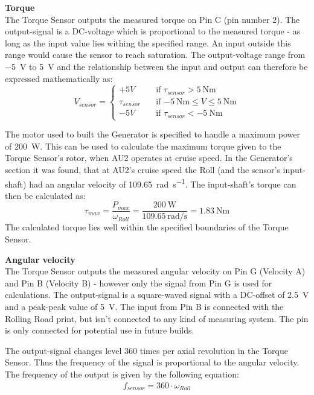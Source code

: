\textbf{Torque}\\
The Torque Sensor outputs the measured torque on Pin C (pin number 2). The output-signal is a DC-voltage which is proportional to the measured torque - as long as the input value lies withing the specified range. An input outside this range would cause the sensor to reach saturation. The output-voltage range from \SI{-5}{\volt} to \SI{+5}{\volt} and the relationship between the input and output can therefore be expressed mathematically as:
\begin{equation}
	V_{sensor} = 
	\begin{cases}
		+5V				& \quad \text{if } \tau_{sensor} > \SI{+5}{\newton \meter}\\
		\tau_{sensor}   & \quad \text{if } \SI{-5}{\newton \meter} \leq V \leq \SI{+5}{\newton \meter}\\
		-5V				& \quad \text{if } \tau_{sensor} < \SI{-5}{\newton \meter}
	\end{cases}
\end{equation}

The motor used to built the Generator is specified to handle a maximum power of \SI{200}{\watt}\cite{Maxon}. This can be used to calculate the maximum torque given to the Torque Sensor's rotor, when AU2 operates at cruise speed. In the Generator's section it was found, that at AU2's cruise speed the Roll (and the sensor's input-shaft) had an angular velocity of \SI[per-mode=fraction]{109.65}{\radian \per \second}. The input-shaft's torque can then be calculated as:
\begin{equation}
	\tau_{max} = \frac{P_{max}}{\omega_{Roll}} = \frac{\SI{200}{\watt}}{\SI[per-mode=fraction]{109.65}{\radian \per \second}} = \SI{1.83}{\newton \meter}
\end{equation}
The calculated torque lies well within the specified boundaries of the Torque Sensor\cite{TorqueSensor}.

\textbf{Angular velocity}\\
The Torque Sensor outputs the measured angular velocity on Pin G (Velocity A) and Pin B (Velocity B) - however only the signal from Pin G is used for calculations. The output-signal is a square-waved signal with a DC-offset of \SI{2.5}{\volt} and a peak-peak value of \SI{5}{\volt}. The input from Pin B is connected with the Rolling Road print, but isn't connected to any kind of measuring system. The pin is only connected for potential use in future builds.

The output-signal changes level 360 times per axial revolution in the Torque Sensor. Thus the frequency of the signal is proportional to the angular velocity. The frequency of the output is given by the following equation:
\begin{equation}
	\begin{split}
		f_{sensor} = 360 \cdot \omega_{Roll}
	\end{split}
\end{equation}

